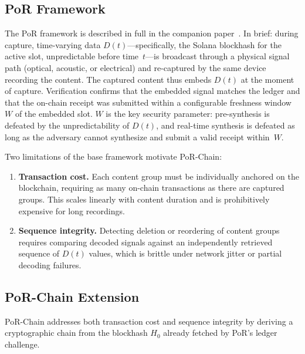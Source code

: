 \documentclass[11pt]{article}
\begin{document}
\subsection{PoR Framework}
\label{sec:por}

The PoR framework is described in full in the companion paper~\cite{por}. In brief:
during capture, time-varying data $D(t)$---specifically, the Solana blockhash for
the active slot, unpredictable before time~$t$---is broadcast through a physical
signal path (optical, acoustic, or electrical) and re-captured by the same device
recording the content. The captured content thus embeds $D(t)$ at the moment of
capture. Verification confirms that the embedded signal matches the ledger and that
the on-chain receipt was submitted within a configurable freshness window~$W$ of the
embedded slot. $W$ is the key security parameter: pre-synthesis is defeated by the
unpredictability of $D(t)$, and real-time synthesis is defeated as long as the
adversary cannot synthesize and submit a valid receipt within~$W$.

Two limitations of the base framework motivate PoR-Chain:
\begin{enumerate}
  \item \textbf{Transaction cost.} Each content group must be individually anchored
    on the blockchain, requiring as many on-chain transactions as there are captured
    groups. This scales linearly with content duration and is prohibitively expensive
    for long recordings.
  \item \textbf{Sequence integrity.} Detecting deletion or reordering of content
    groups requires comparing decoded signals against an independently retrieved
    sequence of $D(t)$ values, which is brittle under network jitter or partial
    decoding failures.
\end{enumerate}

\subsection{PoR-Chain Extension}
\label{sec:rhc}

PoR-Chain addresses both transaction cost and sequence integrity by deriving a
cryptographic chain from the blockhash $H_0$ already fetched by PoR's ledger
challenge.
\end{document}
